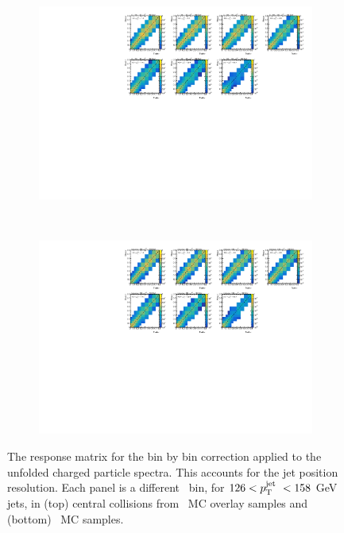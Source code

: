 \begin{figure}
\centering
\begin{subfigure}{1.\textwidth}
\centering \includegraphics[page=1, width=1\textwidth]{figures/main/corrections/ShapeResponse2D_PbPb.pdf}
\caption{}
\label{fig:PbPb_bbb_2d_response}
\end{subfigure} \\
\begin{subfigure}{1.\textwidth}
\centering \includegraphics[page=1, width=1\textwidth]{figures/main/corrections/ShapeResponse2D_pp.pdf}
\caption{}
\label{fig:pp_bbb_2d_response}
\end{subfigure}
\caption{The response matrix for the bin by bin correction applied to the unfolded charged particle spectra.
This accounts for the jet position resolution.
Each panel is a different \pttrk\ bin, for $126 < \mbox{$p_{\mathrm{T}}^{\mathrm{jet}}$}\ < 158$ GeV jets, in (top) central collisions from \pbpb\ MC overlay samples and (bottom) \pp\ MC samples.}
\label{fig:bbb_2d_response}
\end{figure}


